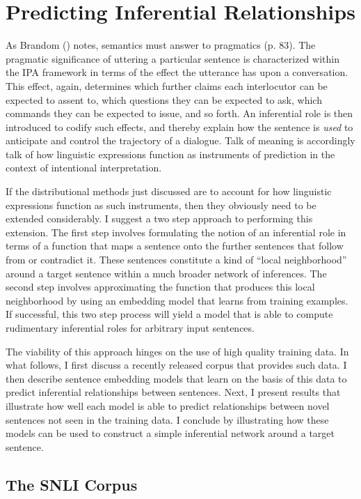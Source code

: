 \section{Predicting Inferential Relationships}

As Brandom (\citeyear{Brandom:1994}) notes, semantics must answer to pragmatics (p. 83). The pragmatic significance of uttering a particular sentence is characterized within the IPA framework in terms of the effect the utterance has upon a conversation. This effect, again, determines which further claims each interlocutor can be expected to assent to, which questions they can be expected to ask, which commands they can be expected to issue, and so forth. An inferential role is then introduced to codify such effects, and thereby explain how the sentence is \textit{used} to anticipate and control the trajectory of a dialogue. Talk of meaning is accordingly talk of how linguistic expressions function as instruments of prediction in the context of intentional interpretation.  

If the distributional methods just discussed are to account for how linguistic expressions function as such instruments, then they obviously need to be extended considerably. I suggest a two step approach to performing this extension. The first step involves formulating the notion of an inferential role in terms of a function that maps a sentence onto the further sentences that follow from or contradict it. These sentences constitute a kind of ``local neighborhood'' around a target sentence within a much broader network of inferences. The second step involves approximating the function that produces this local neighborhood by using an embedding model that learns from training examples. If successful, this two step process will yield a model that is able to compute rudimentary inferential roles for arbitrary input sentences. 

The viability of this approach hinges on the use of high quality training data. In what follows, I first discuss a recently released corpus that provides such data. I then describe sentence embedding models that learn on the basis of this data to predict inferential relationships between sentences. Next, I present results that illustrate how well each model is able to predict relationships between novel sentences not seen in the training data. I conclude by illustrating how these models can be used to construct a simple inferential network around a target sentence.  

\subsection{The SNLI Corpus}

